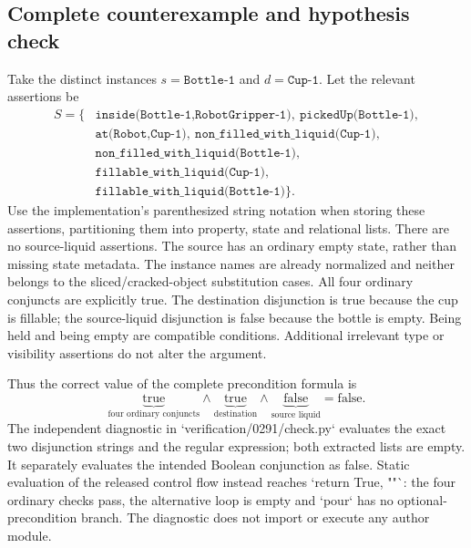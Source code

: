 \documentclass[10pt]{article}
\begin{document}
\subsection*{Complete counterexample and hypothesis check}
Take the distinct instances \(s=\texttt{Bottle-1}\) and \(d=\texttt{Cup-1}\). Let the relevant assertions be \[\begin{aligned}
S=\{&
 \texttt{inside(Bottle-1,RobotGripper-1)},\
 \texttt{pickedUp(Bottle-1)},\\
&\texttt{at(Robot,Cup-1)},\
 \texttt{non\_filled\_with\_liquid(Cup-1)},\\
&\texttt{non\_filled\_with\_liquid(Bottle-1)},\\
&\texttt{fillable\_with\_liquid(Cup-1)},\\
&\texttt{fillable\_with\_liquid(Bottle-1)}\}.\end{aligned}\] Use the implementation’s parenthesized string notation when storing these assertions, partitioning them into property, state and relational lists. There are no source-liquid assertions. The source has an ordinary empty state, rather than missing state metadata. The instance names are already normalized and neither belongs to the sliced/cracked-object substitution cases. All four ordinary conjuncts are explicitly true. The destination disjunction is true because the cup is fillable; the source-liquid disjunction is false because the bottle is empty. Being held and being empty are compatible conditions. Additional irrelevant type or visibility assertions do not alter the argument.\par
Thus the correct value of the complete precondition formula is \[\underbrace{\mathrm{true}}_{\text{four ordinary conjuncts}}
  \wedge\underbrace{\mathrm{true}}_{\text{destination}}
  \wedge\underbrace{\mathrm{false}}_{\text{source liquid}}
  =\mathrm{false}.\] The independent diagnostic in `verification/0291/check.py` evaluates the exact two disjunction strings and the regular expression; both extracted lists are empty. It separately evaluates the intended Boolean conjunction as false. Static evaluation of the released control flow instead reaches `return True, ""`: the four ordinary checks pass, the alternative loop is empty and `pour` has no optional-precondition branch. The diagnostic does not import or execute any author module.\par
\end{document}
